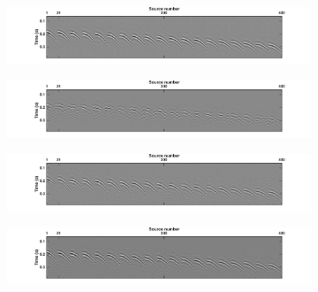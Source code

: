 \begin{figure}
	\centering
	\begin{subfigure}[t]{0.8\textwidth}
		\centering
		\includegraphics[width = \textwidth]{Plots/BlendingPatterns/Unblended_Delphi_zoom}
		\caption{}
		\label{fig:Ch-Results-Unbl-Delphi}
	\end{subfigure}
	\par\bigskip
	\centering
	\begin{subfigure}[t]{0.8\textwidth}
		\centering
		\includegraphics[width = \textwidth]{Plots/BlendingPatterns/Deblended_Delphi_zoomx}
		\caption{}
		\label{fig:Ch-Results-Debl-Delphi-x}
	\end{subfigure}
	\par\bigskip
	\centering
	\begin{subfigure}[t]{0.8\textwidth}
		\centering
		\includegraphics[width = \textwidth]{Plots/BlendingPatterns/Deblended_Delphi_zoomt}
		\caption{}
		\label{fig:Ch-Results-Debl-Delphi-t}
	\end{subfigure}
	\par\bigskip
	\centering
	\begin{subfigure}[t]{0.8\textwidth}
		\centering
		\includegraphics[width = \textwidth]{Plots/BlendingPatterns/Deblended_Delphi_zoomxt}
		\caption{}
		\label{fig:Ch-Results-Debl-Delphi-xt}
	\end{subfigure}
	

\end{figure}
